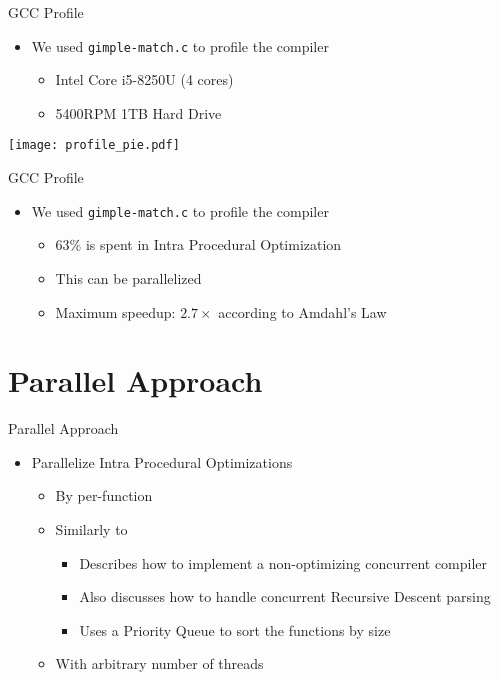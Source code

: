 \begin{frame}{GCC Profile}
    \begin{itemize}
        \item We used \texttt{gimple-match.c} to profile the compiler
            \begin{itemize}
                \item Intel Core i5-8250U (4 cores)
                \item 5400RPM 1TB Hard Drive
            \end{itemize}
    \end{itemize}

            \centering
            \texttt{[image: profile\_pie.pdf]}
\end{frame}

\begin{frame}{GCC Profile}
    \begin{itemize}
        \item We used \texttt{gimple-match.c} to profile the compiler
            \begin{itemize}
                \item 63\% is spent in Intra Procedural Optimization
                \item This can be parallelized
                \item Maximum speedup: $2.7\times$ according to Amdahl's Law
            \end{itemize}
    \end{itemize}

\end{frame}

\section{Parallel Approach}

\begin{frame}{Parallel Approach}
    \begin{itemize}
        \item Parallelize Intra Procedural Optimizations
            \begin{itemize}
                \item By per-function
                \item Similarly to \cite{wortman1992}
                    \begin{itemize}
                        \item Describes how to implement a non-optimizing concurrent compiler
                        \item Also discusses how to handle concurrent Recursive Descent parsing
                        \item Uses a Priority Queue to sort the functions by size
                    \end{itemize}
                \item With arbitrary number of threads
    \end{itemize}
\end{itemize}

\end{frame}

